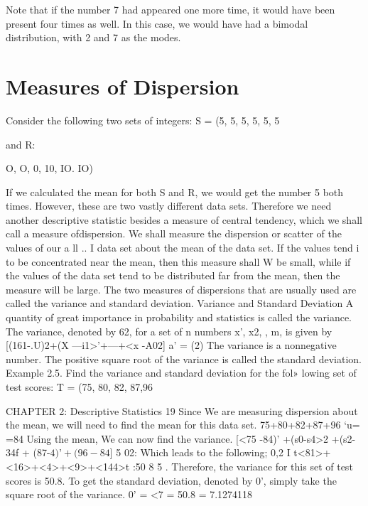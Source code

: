{Note that if the number 7 had appeared one more time, it would have been present four times as well. In this case, we would have had a bimodal distribution, with 2 and 7 as the modes.
\section{Measures of Dispersion}

Consider the following two sets of integers:
S = (5, 5, 5, 5, 5, 5} and R: {O, O, 0, 10, IO. IO)

If we calculated the mean for both S and R, we
would get the number 5 both times. However, these are two vastly different data sets. Therefore we need another
descriptive statistic besides a measure of central tendency, which we shall call a measure ofdispersion. We shall 
measure the dispersion or scatter of the values of our a
ll .. I
data set about the mean of the data set. If the values tend i
to be concentrated near the mean, then this measure shall  W
be small, while if the values of the data set tend to be distributed far from the mean, then the measure will be
large. The two measures of dispersions that are usually
used are called the variance and standard deviation.
Variance and Standard Deviation
A quantity of great importance in probability and statistics is called the
variance. The variance, denoted by 62, for a set of n numbers x’, x2,  ,
m, is given by
[(161-.U)2+(X —i1>’+---+<x -A02]
a’ =  (2)
The variance is a nonnegative number. The positive square root of the variance is called the standard deviation.
Example 2.5. Find the variance and standard deviation for the fol»
lowing set of test scores:
T = (75, 80, 82, 87,96}


CHAPTER 2: Descriptive Statistics 19
Since We are measuring dispersion about the mean, we will need to
ﬁnd the mean for this data set.
75+80+82+87+96
‘u= =84
Using the mean, We can now ﬁnd the variance.
[<75 -84)’ +(s0-s4>2 +(s2- 34f + (87-$4)’ +(96 - 84$]
5
02:
Which leads to the following;
0,2 I t<81>+<16>+<4>+<9>+<144>t :50 8
5 .
Therefore, the variance for this set of test scores is 50.8. To get the
standard deviation, denoted by 0', simply take the square root of the
variance.
0' = \/<7 = \/50.8 = 7.1274118

